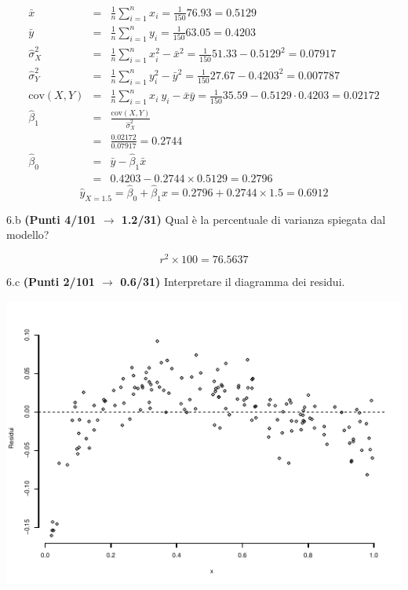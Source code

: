 \documentclass[
  11pt,
]{book}
\theoremstyle{mytheoremstyle}
\theoremstyle{mydefstyle}
\newenvironment{sol}
  {
  \begin{tcolorbox}[enhanced,breakable,arc=0.1mm,boxrule=1pt,colback=white,colframe=iblue,
  title=\bf \fontfamily{lmss}\selectfont \hspace{.5 cm} Soluzione,drop fuzzy shadow]

}{
\end{tcolorbox}
  }
\begin{document}
\begin{sol}
\begin{eqnarray*}
           \bar x &=&\frac 1 n\sum_{i=1}^n x_i = \frac {1}{ 150 }  76.93 =  0.5129 \\
           \bar y &=&\frac 1 n\sum_{i=1}^n y_i = \frac {1}{ 150 }  63.05 =  0.4203 \\
           \hat\sigma_X^2&=&\frac 1 n\sum_{i=1}^n x_i^2-\bar x^2=\frac {1}{ 150 }  51.33  - 0.5129 ^2= 0.07917 \\
           \hat\sigma_Y^2&=&\frac 1 n\sum_{i=1}^n y_i^2-\bar y^2=\frac {1}{ 150 }  27.67  - 0.4203 ^2= 0.007787 \\
           \text{cov}(X,Y)&=&\frac 1 n\sum_{i=1}^n x_i~y_i-\bar x\bar y=\frac {1}{ 150 }  35.59 - 0.5129 \cdot 0.4203 = 0.02172 \\
           \hat\beta_1 &=& \frac{\text{cov}(X,Y)}{\hat\sigma_X^2} \\
                    &=& \frac{ 0.02172 }{ 0.07917 }  =  0.2744 \\
           \hat\beta_0 &=& \bar y - \hat\beta_1 \bar x\\
                    &=&  0.4203 - 0.2744 \times  0.5129 = 0.2796 
         \end{eqnarray*}\[\hat y_{X= 1.5 }=\hat\beta_0+\hat\beta_1 x= 0.2796 + 0.2744 \times 1.5 = 0.6912 \]

\end{sol}

6.b \textbf{(Punti 4/101 \(\rightarrow\) 1.2/31)} Qual è la percentuale di varianza spiegata dal modello?

\begin{sol}
\[r^2\times 100=76.5637\]

\end{sol}

6.c \textbf{(Punti 2/101 \(\rightarrow\) 0.6/31)} Interpretare il diagramma dei residui.

\begin{center}\includegraphics{Esami_passati_con_soluzioni_files/figure-latex/2023-4,-1} \end{center}
\end{document}
